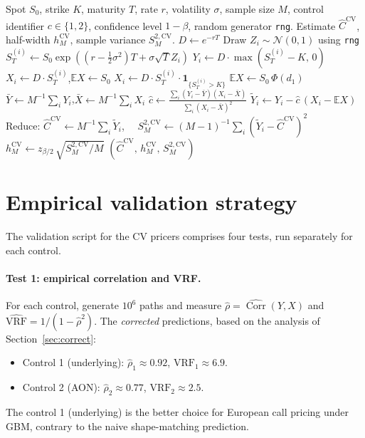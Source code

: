 \documentclass[11pt,a4paper]{article}
\theoremstyle{plain}
\theoremstyle{definition}
\theoremstyle{remark}
\newcommand{\E}{\mathbb{E}}
\newcommand{\Corr}{\operatorname{Corr}}
\newcommand{\indic}{\mathbf{1}}
\begin{document}
\begin{algorithm}[H]
\caption{Control-variate Monte Carlo for the European call (exact GBM)}
\label{alg:mc-cv}
\begin{algorithmic}[1]
\Require Spot $S_0$, strike $K$, maturity $T$, rate $r$, volatility
$\sigma$, sample size $M$, control identifier $c \in \{1, 2\}$,
confidence level $1 - \beta$, random generator \texttt{rng}.
\Ensure Estimate $\hat C^{\mathrm{CV}}$, half-width $h_M^{\mathrm{CV}}$,
sample variance $S_M^{2,\mathrm{CV}}$.
\State $D \gets e^{-rT}$
\State Draw $Z_i \sim \mathcal{N}(0, 1)$ using \texttt{rng}
\State $S_T^{(i)} \gets S_0 \exp((r - \tfrac{1}{2}\sigma^2)T
+ \sigma\sqrt{T} Z_i)$
\State $Y_i \gets D \cdot \max(S_T^{(i)} - K,\, 0)$
\State $X_i \gets D \cdot S_T^{(i)}$,\quad $\E X \gets S_0$
\State $X_i \gets D \cdot S_T^{(i)} \cdot \indic_{\{S_T^{(i)} > K\}}$
\State $\E X \gets S_0\, \Phi(d_1)$ 
\EndIf
\EndFor
\State $\bar Y \gets M^{-1} \sum_i Y_i$,\quad $\bar X \gets M^{-1} \sum_i X_i$
\State $\hat c \gets \frac{\sum_i (Y_i - \bar Y)(X_i - \bar X)}
                          {\sum_i (X_i - \bar X)^2}$
\State $\tilde Y_i \gets Y_i - \hat c\,(X_i - \E X)$
\EndFor
\State Reduce: $\hat C^{\mathrm{CV}} \gets M^{-1} \sum_i \tilde Y_i$,
$\quad S_M^{2,\mathrm{CV}} \gets (M-1)^{-1} \sum_i (\tilde Y_i -
\hat C^{\mathrm{CV}})^2$
\State $h_M^{\mathrm{CV}} \gets z_{\beta/2}\,
\sqrt{S_M^{2,\mathrm{CV}}/M}$
\State \Return $(\hat C^{\mathrm{CV}},\, h_M^{\mathrm{CV}},\,
S_M^{2,\mathrm{CV}})$
\end{algorithmic}
\end{algorithm}

\section{Empirical validation strategy}
\label{sec:validation}

The validation script for the CV pricers comprises four tests, run
separately for each control.

\paragraph{Test 1: empirical correlation and VRF.} For each control,
generate $10^6$ paths and measure $\hat\rho = \widehat{\Corr}(Y, X)$
and $\widehat{\mathrm{VRF}} = 1/(1 - \hat\rho^2)$. The
\emph{corrected} predictions, based on the analysis of
Section~\ref{sec:correct}:
\begin{itemize}
\item Control 1 (underlying): $\hat\rho_1 \approx 0.92$, $\mathrm{VRF}_1
\approx 6.9$.
\item Control 2 (AON): $\hat\rho_2 \approx 0.77$, $\mathrm{VRF}_2
\approx 2.5$.
\end{itemize}
The control 1 (underlying) is the better choice for European call
pricing under GBM, contrary to the naive shape-matching prediction.
\end{document}
